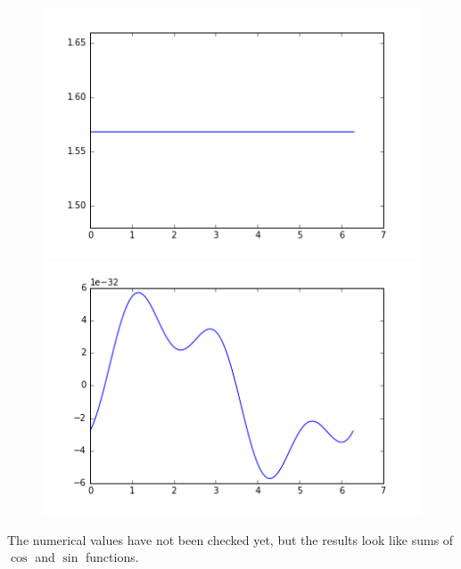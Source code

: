 \documentclass[a4,12pt]{article}
\begin{document}
\begin{figure}[h!]
   \begin{minipage}[c]{.46\linewidth}
      \includegraphics[scale=0.5]{../images/moments/unitDiskProjMoment2.png} 
   \end{minipage} \hfill
   \begin{minipage}[c]{.46\linewidth}
      \includegraphics[scale=0.5]{../images/moments/unitDiskProjMoment3.png} 
   \end{minipage}
\end{figure}

The numerical values have not been checked yet, but the results look like sums of $\cos$ and $\sin$ functions.
\end{document}
